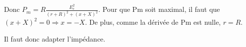 \documentclass[french]{yLectureNote}
\begin{document}
Donc \(P_m = R \frac{E_e^2}{(r+R)^2+(x+X)^2}\). Pour que Pm soit maximal, il faut que \((x+X)^2 = 0 \Rightarrow x=-X\). De plus, comme la dérivée de Pm est nulle,  \(r=R\).

Il faut donc adapter l'impédance.
%
%
%
%
%
%
%
%
%
\end{document}

